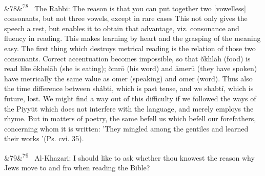 \documentclass[12pt]{article}
\newcommand{\para}[1][]{\par\noindent\ifx&#1&\else\textsuperscript{\footnotesize #1}~\fi}
\begin{document}
\para[78] The Rabbi: The reason is that you can put together two [vowelless] consonants, but not three vowels, except in rare cases This not only gives the speech a rest, but enables it to obtain that advantage, viz. consonance and fluency in reading. This makes learning by heart and the grasping of the meaning easy. The first thing which destroys metrical reading is the relation of those two consonants. Correct accentuation becomes impossible, so that ŏkhlāh (food) is read like ōkhelāh (she is eating); ŏmrō (his word) and āmerū (they have spoken) have metrically the same value as ōmēr (speaking) and ōmer (word). Thus also the time difference between shábti, which is past tense, and we shabtí, which is future, lost. We might find a way out of this difficulty if we followed the ways of the Piyyūt which does not interfere with the language, and merely employs the rhyme. But in matters of poetry, the same befell us which befell our forefathers, concerning whom it is written: 'They mingled among the gentiles and learned their works '(Ps. cvi. 35).

\para[79] Al-Khazari: I should like to ask whether thou knowest the reason why Jews move to and fro when reading the Bible?
\end{document}
